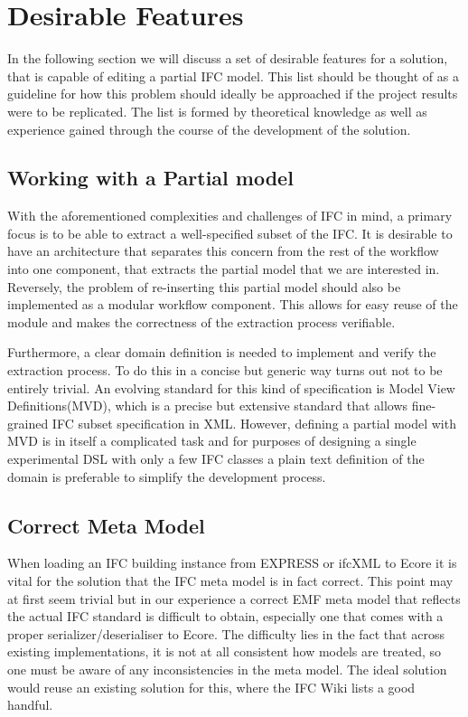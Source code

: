 \section{Desirable Features}
In the following section we will discuss a set of desirable features for a solution, that is capable of editing a partial IFC model. This list should be thought of as a guideline for how this problem should ideally be approached if the project results were to be replicated. The list is formed by theoretical knowledge as well as experience gained through the course of the development of the solution.

\subsection{Working with a Partial model}
With the aforementioned complexities and challenges of IFC in mind, a primary focus is to be able to extract a well-specified subset of the IFC. It is desirable to have an architecture that separates this concern from the rest of the workflow into one component, that extracts the partial model that we are interested in. Reversely, the problem of re-inserting this partial model should also be implemented as a modular workflow component. This allows for easy reuse of the module and makes the correctness of the extraction process verifiable.

Furthermore, a clear domain definition is needed to implement and verify the extraction process. To do this in a concise but generic way turns out not to be entirely trivial. An evolving standard for this kind of specification is Model View Definitions(MVD)\cite{nour08}, which is a precise but extensive standard that allows fine-grained IFC subset specification in XML. However, defining a partial model with MVD is in itself a complicated task and for purposes of designing a single experimental DSL with only a few IFC classes a plain text definition of the domain is preferable to simplify the development process.\cite{mvd}

\subsection{Correct Meta Model}
When loading an IFC building instance from EXPRESS or ifcXML to Ecore it is vital for the solution that the IFC meta model is in fact correct. This point may at first seem trivial but in our experience a correct EMF meta model that reflects the actual IFC standard is difficult to obtain, especially one that comes with a proper serializer/deserialiser to Ecore. The difficulty lies in the fact that across existing implementations, it is not at all consistent how models are treated, so one must be aware of any inconsistencies in the meta model.\cite[pp. 4]{quteprints37725} The ideal solution would reuse an existing solution for this, where the IFC Wiki lists a good handful.\cite{ifcwiki}

